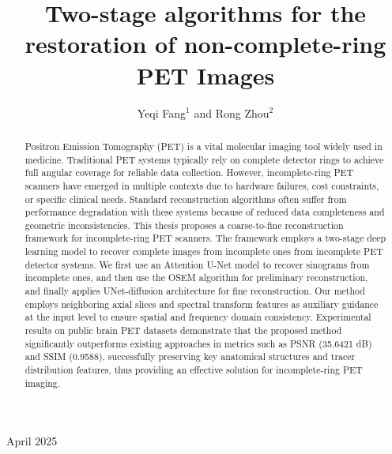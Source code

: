 \documentclass[12pt]{iopart}
\begin{document}
\title{Two-stage algorithms for the restoration of non-complete-ring PET Images}


\author{Yeqi Fang$^1$ and Rong Zhou$^2$}
\address{College of Physics, Sichuan University, Chengdu, 610065, China}

\vspace{10pt}
\begin{indented}
\item[]April 2025
\end{indented}

\begin{abstract}
	Positron Emission Tomography (PET) is a vital molecular imaging tool widely used in medicine. Traditional PET systems typically rely on complete detector rings to achieve full angular coverage for reliable data collection. However, incomplete-ring PET scanners have emerged in multiple contexts due to hardware failures, cost constraints, or specific clinical needs. Standard reconstruction algorithms often suffer from performance degradation with these systems because of reduced data completeness and geometric inconsistencies.
  This thesis proposes a coarse-to-fine reconstruction framework for incomplete-ring PET scanners. 
  The framework employs a two-stage deep learning model to recover complete images from incomplete ones from incomplete PET detector systems.
  We first use an Attention U-Net model to recover sinograms from incomplete ones, and then use the OSEM algorithm for preliminary reconstruction, and finally applies UNet-diffusion architecture for fine reconstruction. Our method employs neighboring axial slices and spectral transform features as auxiliary guidance at the input level to ensure spatial and frequency domain consistency. 
  Experimental results on public brain PET datasets demonstrate that the proposed method significantly outperforms existing approaches in metrics such as PSNR (35.6421 dB) and SSIM (0.9588), successfully preserving key anatomical structures and tracer distribution features, thus providing an effective solution for incomplete-ring PET imaging.
\end{abstract}

%
%
%
% 
%
\end{document}
